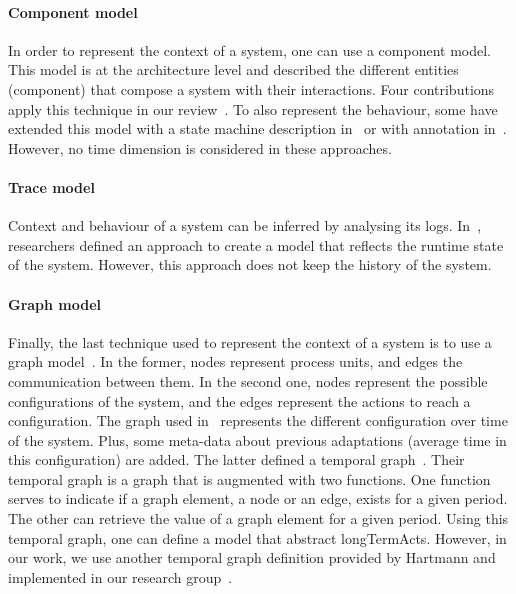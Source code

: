 \paragraph{Component model}
In order to represent the context of a system, one can use a component model.
This model is at the architecture level and described the different entities (component) that compose a system with their interactions.
Four contributions apply this technique in our review~\cite{DBLP:conf/soco/DavidL06, DBLP:conf/wetice/DjoudiBZ14, DBLP:journals/computer/GarlanCHSS04, DBLP:conf/cbse/FouquetMFBPJ12}.
To also represent the behaviour, some have extended this model with a state machine description in~\cite{DBLP:conf/wetice/DjoudiBZ14} or with annotation in~\cite{DBLP:journals/computer/GarlanCHSS04}.
However, no time dimension is considered in these approaches.

\paragraph{Trace model}
Context and behaviour of a system can be inferred by analysing its logs.
In~\cite{DBLP:journals/computer/Maoz09}, researchers defined an approach to create a model that reflects the runtime state of the system.
However, this approach does not keep the history of the system.
	
\paragraph{Graph model}
Finally, the last technique used to represent the context of a system is to use a graph model~\cite{DBLP:journals/tse/KramerM90, DBLP:journals/computer/GeorgasHT09, DBLP:conf/dbpl/MoffittS17}.
In the former, nodes represent process units, and edges the communication between them.
In the second one, nodes represent the possible configurations of the system, and the edges represent the actions to reach a configuration.
The graph used in~\cite{DBLP:journals/computer/GeorgasHT09} represents the different configuration over time of the system.
Plus, some meta-data about previous adaptations (\eg average time in this configuration) are added.
The latter defined a temporal graph~\cite{DBLP:conf/dbpl/MoffittS17}.
Their temporal graph is a graph that is augmented with two functions.
One function serves to indicate if a graph element, a node or an edge, exists for a given period.
The other can retrieve the value of a graph element for a given period.
Using this temporal graph, one can define a model that abstract \glspl{longTermAct}.
However, in our work, we use another temporal graph definition provided by Hartmann \etal and implemented in our research group~\cite{DBLP:journals/is/HartmannFMRT19}.

